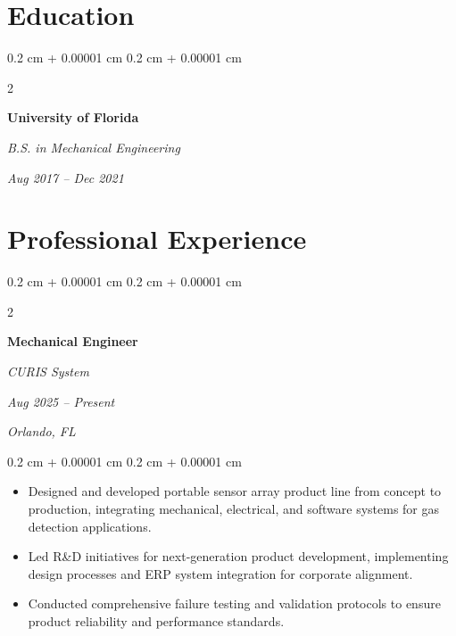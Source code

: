 \documentclass[10pt, letterpaper]{article}
\newenvironment{highlights}{
    \begin{itemize}[
        topsep=0.10 cm,
        parsep=0.10 cm,
        partopsep=0pt,
        itemsep=0pt,
        leftmargin=0.4 cm + 10pt
    ]
}{
    \end{itemize}
} %
\newenvironment{onecolentry}{
    \begin{adjustwidth}{
        0.2 cm + 0.00001 cm
    }{
        0.2 cm + 0.00001 cm
    }
}{
    \end{adjustwidth}
} %
\newenvironment{twocolentry}[2][]{
    \onecolentry
    \def\secondColumn{#2}
    \setcolumnwidth{\fill, 5.0 cm}
    \begin{paracol}{2}
}{
    \switchcolumn \raggedleft \secondColumn
    \end{paracol}
    \endonecolentry
} %
\begin{document}
        \vspace{0.3 cm}


    

    \section{Education}

\vspace{0.2 cm}
        
        \begin{twocolentry}{
            
            
        \textit{Aug 2017 – Dec 2021}}
            \textbf{University of Florida}
            
            \textit{B.S. in Mechanical Engineering}
        \end{twocolentry}

        \vspace{0.15 cm}
        

\vspace{0.3 cm}

    
    \section{Professional Experience}

        \vspace{0.2 cm}

        \begin{twocolentry}{
        \textit{Aug 2025 – Present}
        
        \textit{Orlando, FL}}
            \textbf{Mechanical Engineer}
            
            \textit{CURIS System}
        \end{twocolentry}

        \vspace{0.10 cm}
        \begin{onecolentry}
            \begin{highlights}
                \item Designed and developed portable sensor array product line from concept to production, integrating mechanical, electrical, and software systems for gas detection applications.
                \item Led R\&D initiatives for next-generation product development, implementing design processes and ERP system integration for corporate alignment.
                \item Conducted comprehensive failure testing and validation protocols to ensure product reliability and performance standards.
            \end{highlights}
        \end{onecolentry}
\end{document}

